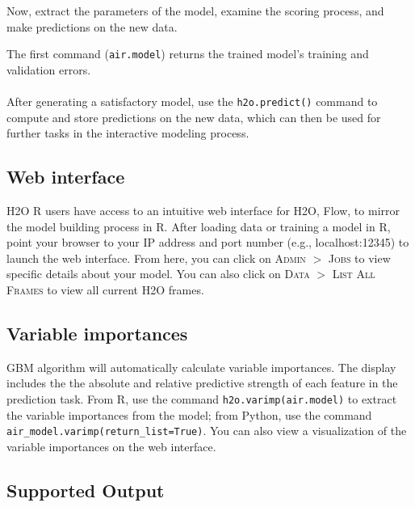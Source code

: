 Now, extract the parameters of the model, examine the scoring process, and make predictions on the new data.

\waterExampleInR


\waterExampleInPython


\noindent
The first command ({\texttt{air.model}}) returns the trained model's training and validation errors.
\\
\\
After generating a satisfactory model, use the \texttt{h2o.predict()} command to compute and store predictions on the
new data, which can then be used for further tasks in the interactive modeling process.

\waterExampleInR


\waterExampleInPython


\newpage
\subsection{Web interface}


H2O R users have access to an intuitive web interface for H2O, Flow, to mirror the model building process in R. After
loading data or training a model in R, point your browser to your IP address and port number (e.g., localhost:12345)
to launch the web interface. From here, you can click on \textsc{Admin} $>$ \textsc{Jobs} to view specific details
about your model. You can also click on \textsc{Data} $>$ \textsc{List All Frames} to view all current H2O frames.

\subsection{Variable importances}

GBM algorithm will automatically calculate variable importances. The display includes the
the absolute and relative predictive strength of each feature in the prediction task. From R, use the command \texttt{h2o.varimp(air.model)} to extract the variable importances from the model;
from Python, use the command 
\texttt{air\_model.varimp(return\_list=True)}.
You can also view a visualization of the variable
importances on the web interface.

\subsection{Supported Output}

